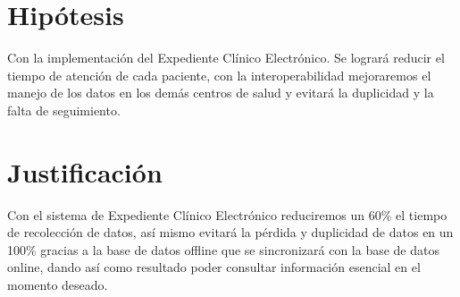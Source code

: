 \section{Hipótesis}
Con la implementación del Expediente Clínico Electrónico. Se logrará reducir el tiempo de atención de cada paciente, con la interoperabilidad mejoraremos el manejo de los datos en los demás centros de salud y evitará la duplicidad y la falta de seguimiento.

\label{sec:hipotesis}



\section{Justificación}
\label{sec:justificacion}
Con el sistema de Expediente Clínico Electrónico reduciremos un 60\% el tiempo de recolección de datos, así mismo evitará la pérdida y duplicidad de datos en un 100\% gracias a la base de datos offline que se sincronizará con la base de datos online, dando así como resultado poder consultar información esencial en el momento deseado.
